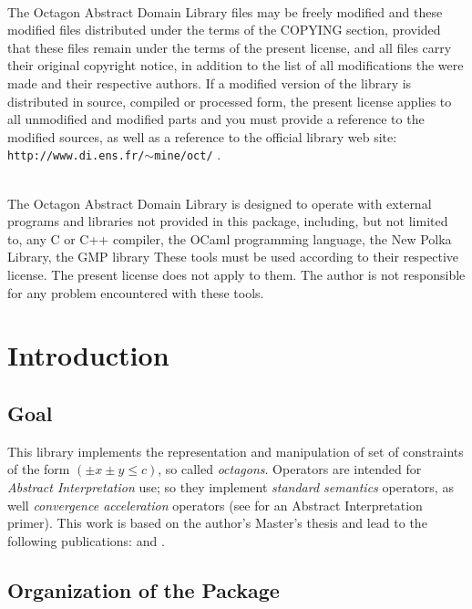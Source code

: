 \documentclass[twosides]{report}
\begin{document}
{\bigskip

\\
The Octagon Abstract Domain Library files may be freely modified and these
modified files distributed under the terms of the COPYING section, provided
that these files remain under the terms of the present license, and
all files carry their original copyright notice, in addition to the list
of all modifications the were made and their respective authors.
If a modified version of the library is distributed in source, compiled or 
processed form, the present license applies to all unmodified and modified
parts and you must provide a reference to the modified sources, as well
as a reference to the official library web site: 
\texttt{http://www.di.ens.fr/$\sim$mine/oct/} .

\bigskip

\\
The Octagon Abstract Domain Library is designed to operate with external
programs and libraries not provided in this package, including,
but not limited to, any C or C++ compiler, the OCaml programming language,
the New Polka Library, the GMP library
These tools must be used according to their respective license.
The present license does not apply to them.
The author is not responsible for any problem encountered with these
tools.

}


\cleardoublepage
\chapter{Introduction}

\section{Goal}
This library implements the representation and manipulation of set
of constraints of the form $(\pm x \pm y\leq c)$, so called {\it octagons}.
Operators are intended for {\it Abstract Interpretation} use; so they
implement {\it standard semantics} operators, as well {\it convergence
acceleration} operators (see \cite{ai} for an Abstract Interpretation primer).
This work is based on the author's Master's thesis \cite{mine:dea} and
lead to the following publications: \cite{mine:padoII} and \cite{mine:ast01}.

\section{Organization of the Package}
\end{document}
